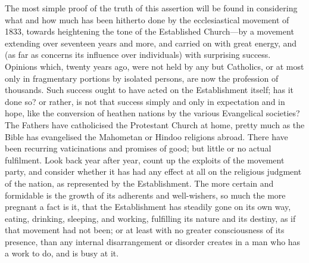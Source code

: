 The most simple proof of the truth of this assertion will be found
in considering what and how much has been hitherto done by the
ecclesiastical movement of 1833, towards heightening the tone of the
Established Church—by a movement extending over seventeen years and
more, and carried on with great energy, and (as far as concerns its
influence over individuals) with surprising success. Opinions which,
twenty years ago, were not held by any but Catholics, or at most only
in fragmentary portions by isolated persons, are now the profession of
thousands. Such success ought to have acted on the Establishment
itself; has it done so? or rather, is not that success simply and only
in expectation and in hope, like the conversion of heathen nations by
the various Evangelical societies? The Fathers have catholicised the
Protestant Church at home, pretty much as the Bible has evangelised
the Mahometan or Hindoo religions abroad. There have been recurring
vaticinations and promises of good; but little or no actual fulfilment.
Look back year after year, count up the exploits of the movement
party, and consider whether it has had any effect at all on the
religious judgment of the nation, as represented by the Establishment.
The more certain and formidable is the growth of its adherents and
well-wishers, so much the more pregnant a fact is it, that the
Establishment has steadily gone on its own way, eating, drinking,
sleeping, and working, fulfilling its nature and its destiny, as if
that movement had not been; or at least with no greater consciousness
of its presence, than any internal disarrangement or disorder creates
in a man who has a work to do, and is busy at it.

